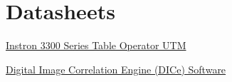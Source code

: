 \documentclass{article}
\begin{document}
\newpage
\begin{appendices}
\pagestyle{fancy}
\renewcommand{\thefigure}{A\arabic{figure}}
\setcounter{figure}{0}

\pagebreak

\hypertarget{datasheets}{}
\section{Datasheets}
\begin{enumerate}[label = {[\arabic*]}]
\small
\item \hypertarget{1}{\href{https://www.instron.com/en/products/testing-systems/universal-testing-systems/low-force-universal-testing-systems/3300-series}{Instron 3300 Series Table Operator UTM}}
\item \hypertarget{2}{\href{https://www.sandia.gov/ccr/software/digital-image-correlation-engine-dice/}{Digital Image Correlation Engine (DICe) Software}}


\end{enumerate}

\end{appendices}
\end{document}

